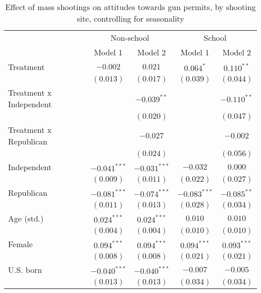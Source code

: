 
\begin{table}
\caption{Effect of mass shootings on attitudes towards gun permits, by shooting site, controlling for seasonality}
\begin{center}
\begin{tabular}{l c c c c}
\toprule
 & \multicolumn{2}{c}{Non-school} & \multicolumn{2}{c}{School} \\
\cmidrule(lr){2-3} \cmidrule(lr){4-5}
 & Model 1 & Model 2 & Model 1 & Model 2 \\
\midrule
Treatment               & $-0.002$       & $0.021$        & $0.064^{*}$    & $0.110^{**}$   \\
                        & $(0.013)$      & $(0.017)$      & $(0.039)$      & $(0.044)$      \\
Treatment x Independent &                & $-0.039^{**}$  &                & $-0.110^{**}$  \\
                        &                & $(0.020)$      &                & $(0.047)$      \\
Treatment x Republican  &                & $-0.027$       &                & $-0.002$       \\
                        &                & $(0.024)$      &                & $(0.056)$      \\
Independent             & $-0.041^{***}$ & $-0.031^{***}$ & $-0.032$       & $0.000$        \\
                        & $(0.009)$      & $(0.011)$      & $(0.022)$      & $(0.027)$      \\
Republican              & $-0.081^{***}$ & $-0.074^{***}$ & $-0.083^{***}$ & $-0.085^{**}$  \\
                        & $(0.011)$      & $(0.013)$      & $(0.028)$      & $(0.034)$      \\
Age (std.)              & $0.024^{***}$  & $0.024^{***}$  & $0.010$        & $0.010$        \\
                        & $(0.004)$      & $(0.004)$      & $(0.010)$      & $(0.010)$      \\
Female                  & $0.094^{***}$  & $0.094^{***}$  & $0.094^{***}$  & $0.093^{***}$  \\
                        & $(0.008)$      & $(0.008)$      & $(0.021)$      & $(0.021)$      \\
U.S. born               & $-0.040^{***}$ & $-0.040^{***}$ & $-0.007$       & $-0.005$       \\
                        & $(0.013)$      & $(0.013)$      & $(0.034)$      & $(0.034)$      \\

\end{tabular}
\end{center}
\end{table}
